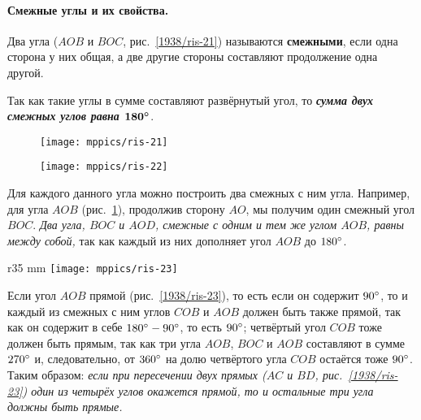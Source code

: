 \paragraph{Смежные углы и их свойства.}\label{1938/22}
Два угла ($AOB$ и $BOC$, рис.~\ref{1938/ris-21}) называются \textbf{смежными}, если одна сторона у них общая, а две другие стороны составляют продолжение одна другой.

Так как такие углы в сумме составляют развёрнутый угол, то \textbf{\emph{сумма двух смежных углов равна $\bm{180\degree}$}}.

\begin{figure}[!ht]
\begin{minipage}{.48\textwidth}
\centering
\texttt{[image: mppics/ris-21]}
\end{minipage}\hfill
\begin{minipage}{.48\textwidth}
\centering
\texttt{[image: mppics/ris-22]}
\end{minipage}

\medskip

\begin{minipage}{.48\textwidth}
\centering
\caption{}\label{1938/ris-21}
\end{minipage}\hfill
\begin{minipage}{.48\textwidth}
\centering
\caption{}\label{1938/ris-22}
\end{minipage}
\vskip-4mm
\end{figure}

Для каждого данного угла можно построить два смежных с ним угла.
Например, для угла $AOB$ (рис.~\ref{1938/ris-22}), продолжив сторону $AO$, мы получим один смежный угол $BOC$.
\emph{Два угла, $BOC$ и $AOD$, смежные с одним и тем же углом $AOB$, равны между собой,} так как каждый из них дополняет угол $AOB$ до $180\degree$.

\begin{wrapfigure}{r}{35 mm}
\vskip-0mm
\centering
\texttt{[image: mppics/ris-23]}
\caption{}\label{1938/ris-23}
\end{wrapfigure}

Если угол $AOB$ прямой (рис.~\ref{1938/ris-23}), то есть если он содержит $90\degree$, то и каждый из смежных с ним углов $COB$ и $AOB$ должен быть также прямой, так как он содержит в себе $180\degree-90\degree$, то есть $90\degree$;
четвёртый угол $COB$ тоже должен быть прямым, так как три угла $AOB$, $BOC$ и $AOB$ составляют в сумме $270\degree$ и, следовательно, от $360\degree$ на долю четвёртого угла $COB$ остаётся тоже $90\degree$.
Таким образом:
\emph{если при пересечении двух прямых \emph{($AC$ и $BD$, рис.~\ref{1938/ris-23})} один из четырёх углов окажется прямой, то и остальные три угла должны быть прямые.}

